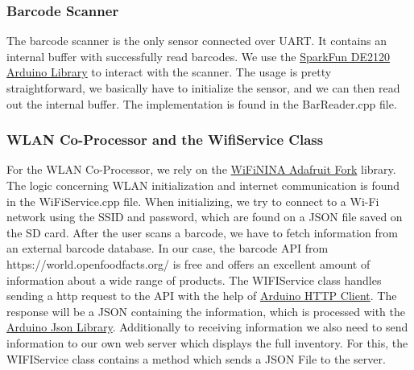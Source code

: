 \documentclass{article}
\begin{document}
\subsubsection{Barcode Scanner}
The barcode scanner is the only sensor connected over UART. It contains an internal buffer with successfully read barcodes.
We use the \href{https://github.com/sparkfun/SparkFun_DE2120_Arduino_Library}{SparkFun DE2120 Arduino Library} to interact with the scanner.
The usage is pretty straightforward, we basically have to initialize the sensor, and we can then read out the internal buffer.
The implementation is found in the BarReader.cpp file.
\subsubsection{WLAN Co-Processor and the WifiService Class}
For the WLAN Co-Processor, we rely on the \href{https://github.com/adafruit/WiFiNINA}{WiFiNINA Adafruit Fork} library.
The logic concerning WLAN initialization and internet communication is found in the WiFiService.cpp file.
When initializing, we try to connect to a Wi-Fi network using the SSID and password, which are found on a JSON file saved on the SD card.
After the user scans a barcode, we have to fetch information from an external barcode database. In our case, the barcode API from https://world.openfoodfacts.org/ is free and offers an excellent amount of information about a wide range of products.
The WIFIService class handles sending a http request to the API with the help of \href{https://github.com/arduino-libraries/ArduinoHttpClient}{Arduino HTTP Client}.
The response will be a JSON containing the information, which is processed with the \href{https://github.com/bblanchon/ArduinoJson}{Arduino Json Library}.
Additionally to receiving information we also need to send information to our own web server which displays the full inventory. For this, the WIFIService class contains a method which sends a JSON File to the server. 
\end{document}
